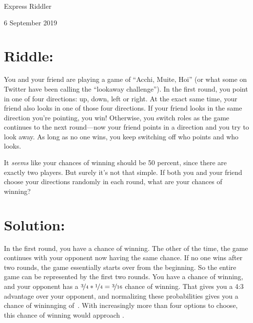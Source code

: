 \documentclass{article}
\begin{document}
\pagestyle{empty} %

\begin{center}
{\LARGE Express Riddler}

\vspace{0.15in}

{\Large 6 September 2019}
\end{center}


\section*{Riddle:}

You and your friend are playing a game of ``Acchi, Muite, Hoi'' (or what some on Twitter have been calling the ``lookaway challenge'').
In the first round, you point in one of four directions: up, down, left or right.
At the exact same time, your friend also looks in one of those four directions.
If your friend looks in the same direction you're pointing, you win!
Otherwise, you switch roles as the game continues to the next round---now your friend points in a direction and you try to look away.
As long as no one wins, you keep switching off who points and who looks.

It \textit{seems} like your chances of winning should be 50 percent, since there are exactly two players.
But surely it's not that simple.
If both you and your friend choose your directions randomly in each round, what are your chances of winning?


\section*{Solution:}

In the first round, you have a  chance of winning.
The other  of the time, the game continues with your opponent now having the same  chance.
If no one wins after two rounds, the game essentially starts over from the beginning.
So the entire game can be represented by the first two rounds.
You have a  chance of winning, and your opponent has a $\nicefrac{3}{4}*\nicefrac{1}{4}=\nicefrac{3}{16}$ chance of winning.
That gives you a 4:3 advantage over your opponent, and normalizing these probabilities gives you a chance of wininnging of
\,.
With increasingly more than four options to choose, this chance of winning would approach .
\end{document}
